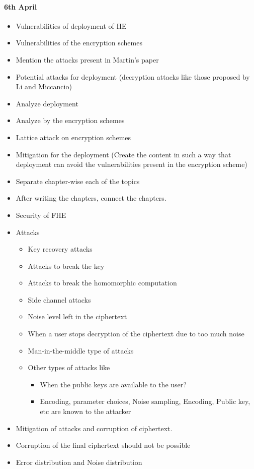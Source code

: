 \paragraph{6th April}
\begin{itemize}
    \item Vulnerabilities of deployment of HE
    \item Vulnerabilities of the encryption schemes
    \item Mention the attacks present in Martin's paper
    \item Potential attacks for deployment (decryption attacks like those proposed by Li and Miccancio)
    \item Analyze deployment
    \item Analyze by the encryption schemes
    \item Lattice attack on encryption schemes
    \item Mitigation for the deployment (Create the content in such a way that deployment can avoid the vulnerabilities present in the encryption scheme)
    \item Separate chapter-wise each of the topics
    \item After writing the chapters, connect the chapters.
    \item Security of FHE
    \item Attacks
          \begin{itemize}
              \item Key recovery attacks
              \item Attacks to break the key
              \item Attacks to break the homomorphic computation
              \item Side channel attacks
              \item Noise level left in the ciphertext
              \item When a user stops decryption of the ciphertext due to too much noise
              \item Man-in-the-middle type of attacks
              \item Other types of attacks like
                    \begin{itemize}
                        \item When the public keys are available to the user?
                        \item Encoding, parameter choices, Noise sampling, Encoding, Public key, etc are known to the attacker
                    \end{itemize}
          \end{itemize}
    \item Mitigation of attacks and corruption of ciphertext.
    \item Corruption of the final ciphertext should not be possible
    \item Error distribution and Noise distribution
\end{itemize}
